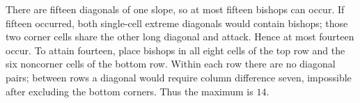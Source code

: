 There are fifteen diagonals of one slope, so at most fifteen bishops can occur. If fifteen occurred, both single-cell extreme diagonals would contain bishops; those two corner cells share the other long diagonal and attack. Hence at most fourteen occur. To attain fourteen, place bishops in all eight cells of the top row and the six noncorner cells of the bottom row. Within each row there are no diagonal pairs; between rows a diagonal would require column difference seven, impossible after excluding the bottom corners. Thus the maximum is $\boxed{14}$.
